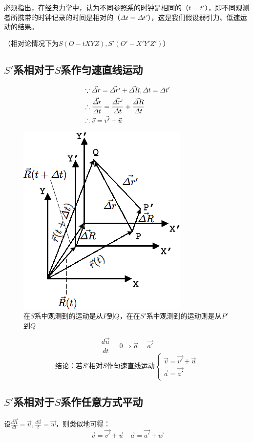必须指出，在经典力学中，认为不同参照系的时钟是相同的（$t=t'$），即不同观测者所携带的时钟记录的时间是相对的（$\varDelta t = \varDelta t'$），这是我们假设弱引力、低速运动的结果。

（相对论情况下为$S(O-tXYZ),S'(O'-X'Y'Z')$）
\subsection{$S'$系相对于$S$系作匀速直线运动}
\begin{align}
&\because \vec{\varDelta r} = \vec{\varDelta r'}+\vec{\varDelta R},\varDelta t = \varDelta t' \notag \\
&\therefore \frac{\vec{\varDelta r}}{\varDelta t} =\frac{\vec{\varDelta r'}}{\varDelta t}+\frac{\vec{\varDelta R}}{\varDelta t} \notag  \\
&\therefore \vec{v} =\vec{v'}+\vec{u} \notag
\end{align}
\begin{figure} [ht]
\centering
\includegraphics[scale=0.5]{frame_transform1.png}
\caption{\simsun 在$S$系中观测到的运动是从$P$到$Q$，在在$S'$系中观测到的运动则是从$P'$到$Q$}
\label{frame_transform1.png}
\end{figure}
\[ \frac{d\vec{u}}{dt}=0 \Rightarrow \vec{a}=\vec{a'} \]
\[
\text{结论：若$S'$相对$S$作匀速直线运动}
\begin{cases}
\vec{v}=\vec{v'}+\vec{u}\\
\vec{a}=\vec{a'}\\
\end{cases}
\]

\subsection{$S'$系相对于$S$系作任意方式平动}
设$\frac{d\vec{R}}{dt}=\vec{u},\frac{d\vec{u}}{t}=\vec{w}$，则类似地可得：
\[ \vec{v}=\vec{v'}+\vec{u}\quad \vec{a}=\vec{a'}+\vec{w}\]
